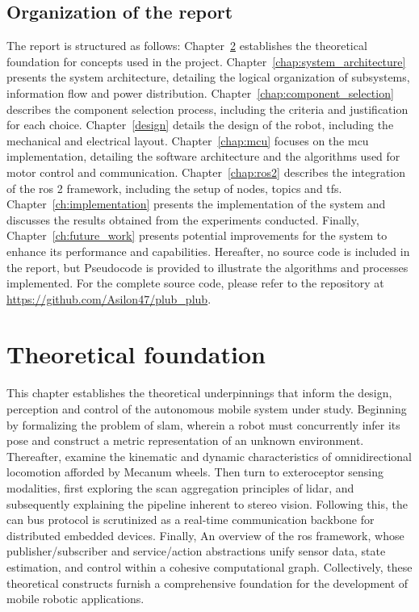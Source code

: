 \section{Organization of the report}
The report is structured as follows: Chapter~\ref{chap:theoretical_foundation} establishes the theoretical foundation for concepts used in the project. Chapter~\ref{chap:system_architecture} presents the system architecture, detailing the logical organization of subsystems, information flow and power distribution. Chapter~\ref{chap:component_selection} describes the component selection process, including the criteria and justification for each choice. Chapter~\ref{design} details the design of the robot, including the mechanical and electrical layout. Chapter~\ref{chap:mcu} focuses on the \gls{mcu} implementation, detailing the software architecture and the algorithms used for motor control and communication. Chapter~\ref{chap:ros2} describes the integration of the \gls{ros} 2 framework, including the setup of nodes, topics and \glspl{tf}. Chapter~\ref{ch:implementation} presents the implementation of the system and discusses the results obtained from the experiments conducted. Finally, Chapter~\ref{ch:future_work} presents potential improvements for the system to enhance its performance and capabilities.\newline
Hereafter, no source code is included in the report, but Pseudocode is provided to illustrate the algorithms and processes implemented. For the complete source code, please refer to the repository at \url{https://github.com/Asilon47/plub_plub}.



\chapter{Theoretical foundation}\label{chap:theoretical_foundation}

This chapter establishes the theoretical underpinnings that inform the design, perception and control of the autonomous mobile system under study. Beginning by formalizing the problem of \gls{slam}, wherein a robot must concurrently infer its pose and construct a metric representation of an unknown environment. Thereafter, examine the kinematic and dynamic characteristics of omnidirectional locomotion afforded by Mecanum wheels. Then turn to exteroceptor sensing modalities, first exploring the scan aggregation principles of \gls{lidar}, and subsequently explaining the pipeline inherent to stereo vision. Following this, the \gls{can} bus protocol is scrutinized as a real-time communication backbone for distributed embedded devices. Finally, An overview of the \gls{ros} framework, whose publisher/subscriber and service/action abstractions unify sensor data, state estimation, and control within a cohesive computational graph. Collectively, these theoretical constructs furnish a comprehensive foundation for the development of mobile robotic applications.

